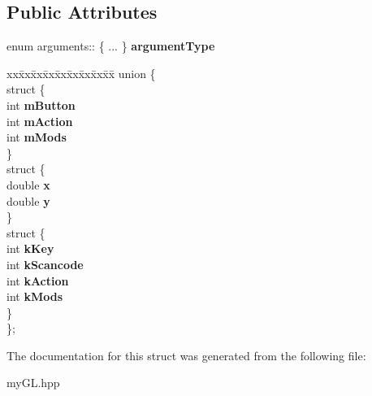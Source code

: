 \subsection*{Public Attributes}
\begin{DoxyCompactItemize}
\item 
\hypertarget{structarguments_abf519974b87f99e908f228df4e753744}{}enum arguments\+:: \{ ... \}  {\bfseries argument\+Type}\label{structarguments_abf519974b87f99e908f228df4e753744}

\item 
\hypertarget{structarguments_a8c1f2ecb9a1af0bbb664198b0adde3f7}{}\begin{tabbing}
xx\=xx\=xx\=xx\=xx\=xx\=xx\=xx\=xx\=\kill
union \{\\
\hypertarget{unionarguments_1_1@8_a71eb30254262533dafc77d824d1dadd4}{}\>struct \{\\
\>\>int {\bfseries mButton}\\
\>\>int {\bfseries mAction}\\
\>\>int {\bfseries mMods}\\
\>\} \label{unionarguments_1_1@8_a71eb30254262533dafc77d824d1dadd4}
\\
\hypertarget{unionarguments_1_1@8_aaefa80bdc5f207233c2aa3ef30923001}{}\>struct \{\\
\>\>double {\bfseries x}\\
\>\>double {\bfseries y}\\
\>\} \label{unionarguments_1_1@8_aaefa80bdc5f207233c2aa3ef30923001}
\\
\hypertarget{unionarguments_1_1@8_a7400297ef620036daccc345479784f2d}{}\>struct \{\\
\>\>int {\bfseries kKey}\\
\>\>int {\bfseries kScancode}\\
\>\>int {\bfseries kAction}\\
\>\>int {\bfseries kMods}\\
\>\} \label{unionarguments_1_1@8_a7400297ef620036daccc345479784f2d}
\\
\}; \label{structarguments_a8c1f2ecb9a1af0bbb664198b0adde3f7}
\\

\end{tabbing}\end{DoxyCompactItemize}


The documentation for this struct was generated from the following file\+:\begin{DoxyCompactItemize}
\item 
my\+G\+L.\+hpp\end{DoxyCompactItemize}
